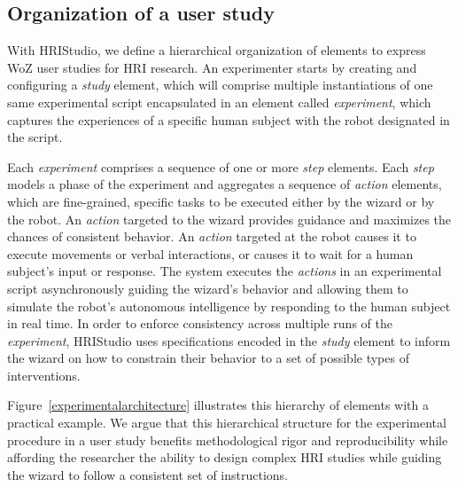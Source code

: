 \documentclass[letterpaper, 10 pt, conference]{ieeeconf}
\begin{document}
\subsection{Organization of a user study}

With HRIStudio, we define a hierarchical organization of elements to express WoZ user studies for HRI research. An experimenter starts by creating and configuring a \emph{study} element, which will comprise multiple instantiations of one same experimental script encapsulated in an element called \emph{experiment}, which captures the experiences of a specific human subject with the robot designated in the script. 

Each \emph{experiment} comprises a sequence of one or more \emph{step} elements. Each \emph{step} models a phase of the experiment and aggregates a sequence of \emph{action} elements, which are fine-grained, specific tasks to be executed either by the wizard or by the robot. An \emph{action} targeted to the wizard provides guidance and maximizes the chances of consistent behavior. An \emph{action} targeted at the robot causes it to execute movements or verbal interactions, or causes it to wait for a human subject's input or response. The system executes the \emph{actions} in an experimental script asynchronously guiding the wizard's behavior and allowing them to simulate the robot's autonomous intelligence by responding to the human subject in real time. In order to enforce consistency across multiple runs of the \emph{experiment}, HRIStudio uses specifications encoded in the \emph{study} element to inform the wizard on how to constrain their behavior to a set of possible types of interventions.

Figure~\ref{experimentalarchitecture} illustrates this hierarchy of elements with a practical example.  We argue that this hierarchical structure for the experimental procedure in a user study benefits methodological rigor and reproducibility while affording the researcher the ability to design complex HRI studies while guiding the wizard to follow a consistent set of instructions.


\end{document}
